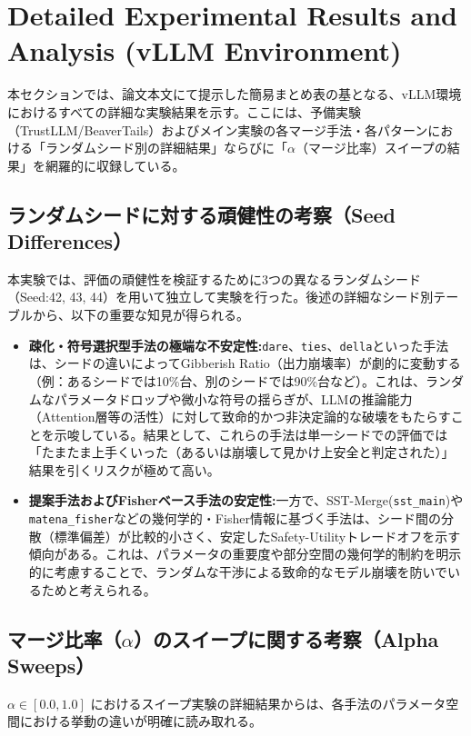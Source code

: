 \documentclass{article}
\begin{document}
\FloatBarrier
\section{Detailed Experimental Results and Analysis (vLLM Environment)}
\label{sec:appendix_detailed_results}

本セクションでは、論文本文にて提示した簡易まとめ表の基となる、vLLM環境におけるすべての詳細な実験結果を示す。ここには、予備実験（TrustLLM/BeaverTails）およびメイン実験の各マージ手法・各パターンにおける「ランダムシード別の詳細結果」ならびに「$\alpha$（マージ比率）スイープの結果」を網羅的に収録している。

\subsection{ランダムシードに対する頑健性の考察（Seed Differences）}
本実験では、評価の頑健性を検証するために3つの異なるランダムシード（Seed:42, 43, 44）を用いて独立して実験を行った。後述の詳細なシード別テーブルから、以下の重要な知見が得られる。

\begin{itemize}
    \item \textbf{疎化・符号選択型手法の極端な不安定性:}\texttt{dare}、\texttt{ties}、\texttt{della}といった手法は、シードの違いによってGibberish Ratio（出力崩壊率）が劇的に変動する（例：あるシードでは10\%台、別のシードでは90\%台など）。これは、ランダムなパラメータドロップや微小な符号の揺らぎが、LLMの推論能力（Attention層等の活性）に対して致命的かつ非決定論的な破壊をもたらすことを示唆している。結果として、これらの手法は単一シードでの評価では「たまたま上手くいった（あるいは崩壊して見かけ上安全と判定された）」結果を引くリスクが極めて高い。
    \item \textbf{提案手法およびFisherベース手法の安定性:}一方で、SST-Merge(\texttt{sst\_main})や\texttt{matena\_fisher}などの幾何学的・Fisher情報に基づく手法は、シード間の分散（標準偏差）が比較的小さく、安定したSafety-Utilityトレードオフを示す傾向がある。これは、パラメータの重要度や部分空間の幾何学的制約を明示的に考慮することで、ランダムな干渉による致命的なモデル崩壊を防いでいるためと考えられる。
\end{itemize}

\subsection{マージ比率（$\alpha$）のスイープに関する考察（Alpha Sweeps）}
$\alpha \in [0.0, 1.0]$ におけるスイープ実験の詳細結果からは、各手法のパラメータ空間における挙動の違いが明確に読み取れる。
\end{document}
